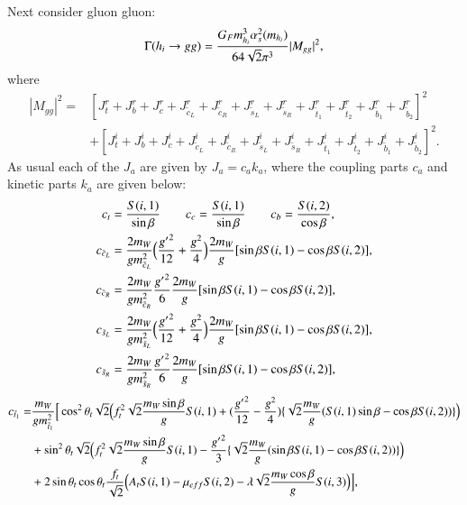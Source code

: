 \documentclass[final,3p,times,pdflatex]{elsarticle}
\begin{document}
Next consider gluon gluon:
\begin{equation} \label{hggNMSSM}
\Gamma(h_{i} \rightarrow gg) = {G_{F} m_{h_i}^3 \alpha_{s}^2 (m_{h_i}) \over 64 \sqrt{2} \pi^3} |M_{gg}|^2,
\end{equation}
where
\begin{equation}
\begin{aligned}
|M_{gg}|^2 = & [J_{t}^{r} + J_{b}^{r} + J_{c}^{r} + J_{\tilde{c}_L}^{r} + J_{\tilde{c}_R}^{r} + J_{\tilde{s}_L}^{r} + J_{\tilde{s}_R}^{r} + J_{\tilde{t}_1}^{r} + J_{\tilde{t}_2}^{r} + J_{\tilde{b}_1}^{r} + J_{\tilde{b}_2}^{r}]^2 \\ & + [J_{t}^{i} + J_{b}^{i} + J_{c}^{i} + J_{\tilde{c}_L}^{i} + J_{\tilde{c}_R}^{i} + J_{\tilde{s}_L}^{i} + J_{\tilde{s}_R}^{i} + J_{\tilde{t}_1}^{i} + J_{\tilde{t}_2}^{i} + J_{\tilde{b}_1}^{i} + J_{\tilde{b}_2}^{i}]^2.
\end{aligned}
\end{equation}
As usual each of the $J_a$ are given by $J_{a} = c_{a}k_{a}$, where the coupling parts $c_{a}$ and kinetic parts $k_{a}$ are given below:
\begin{align}
c_{t} &= {S(i,1) \over \sin\beta} \quad \quad c_{c} = {S(i,1) \over \sin\beta} \quad \quad c_{b} = {S(i,2) \over \cos\beta}, \\
c_{\tilde{c}_L} &= {2 m_{W} \over g m_{\tilde{c}_L}^2}\Big({{g'}^2 \over 12} + {g^2 \over 4}\Big){2 m_{W} \over g}[\sin\beta S(i,1) - \cos\beta S(i,2)], \\
c_{\tilde{c}_R} &= {2 m_{W} \over g m_{\tilde{c}_R}^2}{{g'}^2 \over 6}{2 m_{W} \over g}[\sin\beta S(i,1) - \cos\beta S(i,2)], \\
c_{\tilde{s}_L} &= {2 m_{W} \over g m_{\tilde{s}_L}^2}\Big({{g'}^2 \over 12} + {g^2 \over 4}\Big){2 m_{W} \over g}[\sin\beta S(i,1) - \cos\beta S(i,2)], \\
c_{\tilde{s}_R} &= {2 m_{W} \over g m_{\tilde{s}_R}^2}{{g'}^2 \over 6}{2 m_{W} \over g}[\sin\beta S(i,1) - \cos\beta S(i,2)], \\
\end{align}
\begin{equation}
\begin{aligned}
c_{\tilde{t}_1} = & {m_{W} \over g m_{\tilde{t}_1}^2}\Big[\cos^2 \theta_t \sqrt{2}\Big(f_{t}^2\sqrt{2} {m_{W} \sin\beta \over g}S(i,1) + ({{g'}^2 \over 12} - {g^2 \over 4})\{\sqrt{2} {m_{W} \over g}(S(i,1)\sin\beta - \cos\beta S(i,2))\}\Big) \\ & + \sin^2 \theta_t \sqrt{2} \Big(f_{t}^2 \sqrt{2} {m_{W} \sin\beta \over g}S(i,1) - {{g'}^2 \over 3}\{\sqrt{2} {m_{W} \over g}(\sin\beta S(i,1) - \cos\beta S(i,2))\}\Big) \\ & + 2\sin\theta_t \cos\theta_t {f_{t} \over \sqrt{2}}\Big(A_{t}S(i,1) - \mu_{eff}S(i,2) - \lambda\sqrt{2}{m_{W} \cos\beta \over g}S(i,3)\Big)\Big],
\end{aligned}
\end{equation}
\end{document}

